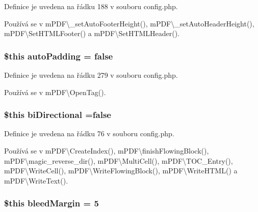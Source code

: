 Definice je uvedena na řádku 188 v souboru config.\-php.



Používá se v m\-P\-D\-F\textbackslash{}\-\_\-set\-Auto\-Footer\-Height(), m\-P\-D\-F\textbackslash{}\-\_\-set\-Auto\-Header\-Height(), m\-P\-D\-F\textbackslash{}\-Set\-H\-T\-M\-L\-Footer() a m\-P\-D\-F\textbackslash{}\-Set\-H\-T\-M\-L\-Header().

\hypertarget{config_8php_a44467dd3722584e4e362e081f16caf23}{
\subsubsection[{auto\-Padding}]{\setlength{\rightskip}{0pt plus 5cm}\$this auto\-Padding = {\bf false}}}\label{config_8php_a44467dd3722584e4e362e081f16caf23}


Definice je uvedena na řádku 279 v souboru config.\-php.



Používá se v m\-P\-D\-F\textbackslash{}\-Open\-Tag().

\hypertarget{config_8php_a9f8ab3f48236828bac556e27bd1fcb99}{
\subsubsection[{bi\-Directional}]{\setlength{\rightskip}{0pt plus 5cm}\$this bi\-Directional ={\bf false}}}\label{config_8php_a9f8ab3f48236828bac556e27bd1fcb99}


Definice je uvedena na řádku 76 v souboru config.\-php.



Používá se v m\-P\-D\-F\textbackslash{}\-Create\-Index(), m\-P\-D\-F\textbackslash{}finish\-Flowing\-Block(), m\-P\-D\-F\textbackslash{}magic\-\_\-reverse\-\_\-dir(), m\-P\-D\-F\textbackslash{}\-Multi\-Cell(), m\-P\-D\-F\textbackslash{}\-T\-O\-C\-\_\-\-Entry(), m\-P\-D\-F\textbackslash{}\-Write\-Cell(), m\-P\-D\-F\textbackslash{}\-Write\-Flowing\-Block(), m\-P\-D\-F\textbackslash{}\-Write\-H\-T\-M\-L() a m\-P\-D\-F\textbackslash{}\-Write\-Text().

\hypertarget{config_8php_a270ce26acf6d2614c717fec7a5db0cf4}{
\subsubsection[{bleed\-Margin}]{\setlength{\rightskip}{0pt plus 5cm}\$this bleed\-Margin = 5}}\label{config_8php_a270ce26acf6d2614c717fec7a5db0cf4}


